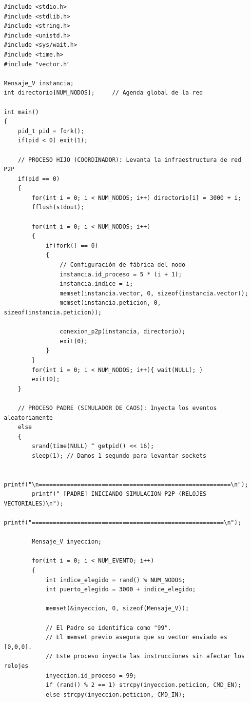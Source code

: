\begin{lstlisting}[style=estiloC]
#include <stdio.h>
#include <stdlib.h>
#include <string.h>
#include <unistd.h>
#include <sys/wait.h>
#include <time.h>
#include "vector.h"

Mensaje_V instancia;
int directorio[NUM_NODOS];     // Agenda global de la red

int main()
{
    pid_t pid = fork();
    if(pid < 0) exit(1);

    // PROCESO HIJO (COORDINADOR): Levanta la infraestructura de red P2P
    if(pid == 0)
    {
        for(int i = 0; i < NUM_NODOS; i++) directorio[i] = 3000 + i;
        fflush(stdout);
        
        for(int i = 0; i < NUM_NODOS; i++)
        {
            if(fork() == 0)
            {
                // Configuración de fábrica del nodo
                instancia.id_proceso = 5 * (i + 1);
                instancia.indice = i;
                memset(instancia.vector, 0, sizeof(instancia.vector));
                memset(instancia.peticion, 0, sizeof(instancia.peticion));
                
                conexion_p2p(instancia, directorio);
                exit(0);
            }
        }
        for(int i = 0; i < NUM_NODOS; i++){ wait(NULL); }
        exit(0);
    }
    
    // PROCESO PADRE (SIMULADOR DE CAOS): Inyecta los eventos aleatoriamente
    else
    {
        srand(time(NULL) ^ getpid() << 16);
        sleep(1); // Damos 1 segundo para levantar sockets
        
        printf("\n=======================================================\n");
        printf(" [PADRE] INICIANDO SIMULACION P2P (RELOJES VECTORIALES)\n");
        printf("=======================================================\n");

        Mensaje_V inyeccion;
        
        for(int i = 0; i < NUM_EVENTO; i++) 
        {
            int indice_elegido = rand() % NUM_NODOS;
            int puerto_elegido = 3000 + indice_elegido;
            
            memset(&inyeccion, 0, sizeof(Mensaje_V));
            
            // El Padre se identifica como "99".
            // El memset previo asegura que su vector enviado es [0,0,0].
            // Este proceso inyecta las instrucciones sin afectar los relojes
            inyeccion.id_proceso = 99; 
            if (rand() % 2 == 1) strcpy(inyeccion.peticion, CMD_EN); 
            else strcpy(inyeccion.peticion, CMD_IN);
            

\end{lstlisting}
